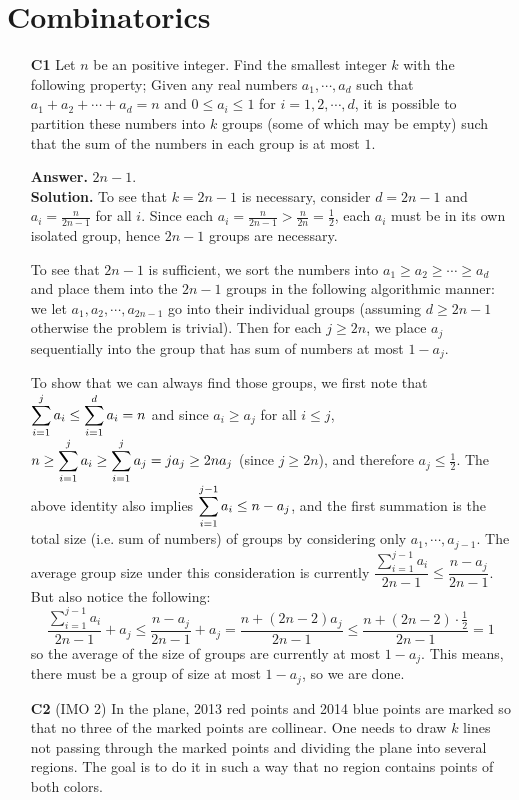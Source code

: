 \documentclass[11pt,a4paper]{article}
\begin{document}
\section*{Combinatorics}
\begin{enumerate}
	\item[\textbf{C1}] Let $n$ be an positive integer. Find the smallest integer $k$ with the following property; Given any real numbers $a_1 , \cdots , a_d $ such that $a_1 + a_2 + \cdots + a_d = n$ and $0 \le a_i \le 1$ for $i=1,2,\cdots ,d$, it is possible to partition these numbers into $k$ groups (some of which may be empty) such that the sum of the numbers in each group is at most $1$.
	
	\textbf{Answer.} $2n-1$.\\
	\textbf{Solution.} To see that $k=2n-1$ is necessary, consider $d=2n-1$ and $a_i=\frac{n}{2n-1}$ for all $i$. Since each $a_i=\frac{n}{2n-1}>\frac{n}{2n}=\frac 12$, each $a_i$ must be in its own isolated group, hence $2n-1$ groups are necessary. 
	
	To see that $2n-1$ is sufficient, we sort the numbers into $a_1\ge a_2\ge\cdots \ge a_d$ and place them into the $2n-1$ groups in the following algorithmic manner: we let $a_1, a_2, \cdots , a_{2n-1}$ go into their individual groups (assuming $d\ge 2n-1$ otherwise the problem is trivial). 
	Then for each $j\ge 2n$, we place $a_j$ sequentially into the group that has sum of numbers at most $1-a_j$. 
	
	To show that we can always find those groups, we first note that $\displaystyle\sum_{i=1}^j a_i\le \displaystyle\sum_{i=1}^d a_i=n$ and since $a_i\ge a_j$ for all $i\le j$, $n\ge \displaystyle\sum_{i=1}^j a_i\ge \displaystyle\sum_{i=1}^j a_j=ja_j\ge 2na_j$ (since $j\ge 2n$), and therefore $a_j\le \frac 12$. 
	The above identity also implies $\displaystyle\sum_{i=1}^{j-1}a_i\le n-a_j$, and the first summation is the total size (i.e. sum of numbers) of groups by considering only $a_1,\cdots , a_{j-1}$. 
	The average group size under this consideration is currently 
	$\dfrac{\sum_{i=1}^{j-1}a_i}{2n-1}\le \dfrac{n-a_j}{2n-1}$. But also notice the following: 
	\[
	\dfrac{\sum_{i=1}^{j-1}a_i}{2n-1}+a_j\le \dfrac{n-a_j}{2n-1}+a_j
	=\frac{n+(2n-2)a_j}{2n-1}
	\le\frac{n+(2n-2)\cdot\frac 12}{2n-1}
	=1
	\]
	so the average of the size of groups are currently at most $1-a_j$. This means, there must be a group of size at most $1-a_j$, so we are done. 
	
	\item [\textbf{C2}] (IMO 2) In the plane, 2013 red points and 2014 blue points are marked so that no three of the marked points are collinear. One needs to draw $k$ lines not passing through the marked points and dividing the plane into several regions. The goal is to do it in such a way that no region contains points of both colors.
	

\end{enumerate}
\end{document}
